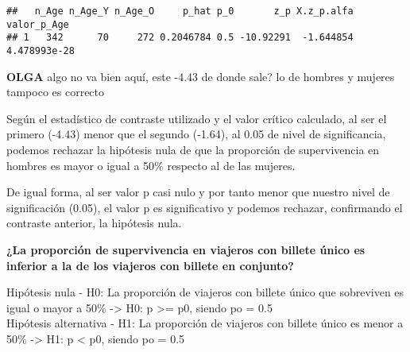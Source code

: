 \documentclass[
]{article}
\begin{document}
\begin{verbatim}
##   n_Age n_Age_Y n_Age_O     p_hat p_0       z_p X.z_p.alfa  valor_p_Age
## 1   342      70     272 0.2046784 0.5 -10.92291  -1.644854 4.478993e-28
\end{verbatim}

\textbf{OLGA} algo no va bien aquí, este -4.43 de donde sale? lo de
hombres y mujeres tampoco es correcto

Según el estadístico de contraste utilizado y el valor crítico
calculado, al ser el primero (-4.43) menor que el segundo (-1.64), al
0.05 de nivel de significancia, podemos rechazar la hipótesis nula de
que la proporción de supervivencia en hombres es mayor o igual a 50\%
respecto al de las mujeres.

De igual forma, al ser valor p casi nulo y por tanto menor que nuestro
nivel de significación (0.05), el valor p es significativo y podemos
rechazar, confirmando el contraste anterior, la hipótesis nula.

\textbf{¿La proporción de supervivencia en viajeros con billete único es
inferior a la de los viajeros con billete en conjunto?}

Hipótesis nula - H0: La proporción de viajeros con billete único que
sobreviven es igual o mayor a 50\% -\textgreater{} H0: p \textgreater=
p0, siendo po = 0.5\\
Hipótesis alternativa - H1: La proporción de viajeros con billete único
es menor a 50\% -\textgreater{} H1: p \textless{} p0, siendo po = 0.5
\end{document}
